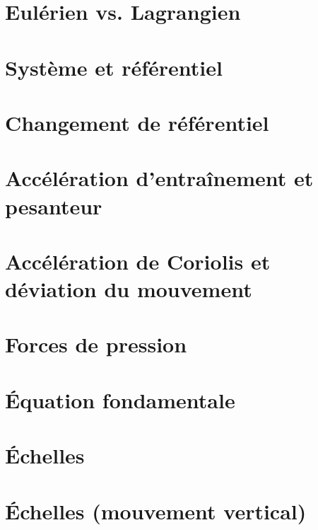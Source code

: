 \documentclass[a4paper,DIV16,10pt]{scrartcl}
\begin{document}
 \inidoc

\section{Eulérien vs. Lagrangien}


\newpage
\section{Système et référentiel}


\newpage
\section{Changement de référentiel}


\newpage
\section{Accélération d'entraînement et pesanteur}


\newpage
\section{Accélération de Coriolis et déviation du mouvement}


\newpage
\section{Forces de pression}


\newpage
\section{\'Equation fondamentale}


\newpage
\section{\'Echelles}


\newpage
\section{\'Echelles (mouvement vertical)}

\end{document}
